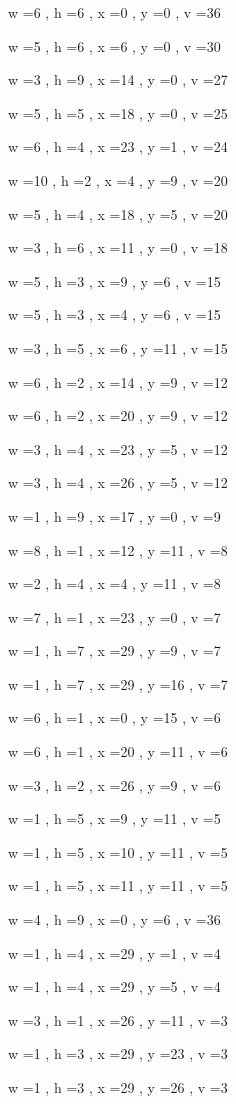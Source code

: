 \documentclass[11pt]{article}
\begin{document}
w =6 , h =6 , x =0 , y =0 , v =36
\par
w =5 , h =6 , x =6 , y =0 , v =30
\par
w =3 , h =9 , x =14 , y =0 , v =27
\par
w =5 , h =5 , x =18 , y =0 , v =25
\par
w =6 , h =4 , x =23 , y =1 , v =24
\par
w =10 , h =2 , x =4 , y =9 , v =20
\par
w =5 , h =4 , x =18 , y =5 , v =20
\par
w =3 , h =6 , x =11 , y =0 , v =18
\par
w =5 , h =3 , x =9 , y =6 , v =15
\par
w =5 , h =3 , x =4 , y =6 , v =15
\par
w =3 , h =5 , x =6 , y =11 , v =15
\par
w =6 , h =2 , x =14 , y =9 , v =12
\par
w =6 , h =2 , x =20 , y =9 , v =12
\par
w =3 , h =4 , x =23 , y =5 , v =12
\par
w =3 , h =4 , x =26 , y =5 , v =12
\par
w =1 , h =9 , x =17 , y =0 , v =9
\par
w =8 , h =1 , x =12 , y =11 , v =8
\par
w =2 , h =4 , x =4 , y =11 , v =8
\par
w =7 , h =1 , x =23 , y =0 , v =7
\par
w =1 , h =7 , x =29 , y =9 , v =7
\par
w =1 , h =7 , x =29 , y =16 , v =7
\par
w =6 , h =1 , x =0 , y =15 , v =6
\par
w =6 , h =1 , x =20 , y =11 , v =6
\par
w =3 , h =2 , x =26 , y =9 , v =6
\par
w =1 , h =5 , x =9 , y =11 , v =5
\par
w =1 , h =5 , x =10 , y =11 , v =5
\par
w =1 , h =5 , x =11 , y =11 , v =5
\par
w =4 , h =9 , x =0 , y =6 , v =36
\par
w =1 , h =4 , x =29 , y =1 , v =4
\par
w =1 , h =4 , x =29 , y =5 , v =4
\par
w =3 , h =1 , x =26 , y =11 , v =3
\par
w =1 , h =3 , x =29 , y =23 , v =3
\par
w =1 , h =3 , x =29 , y =26 , v =3
\par
\newpage
\end{document}
